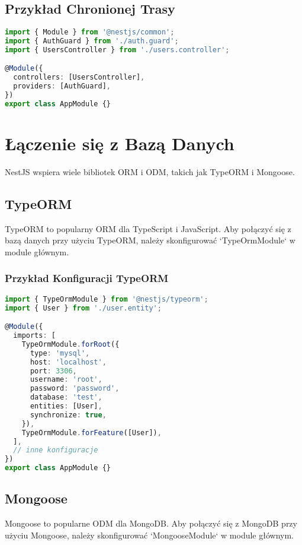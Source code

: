 \documentclass[a4paper,12pt]{article}
\begin{document}
\subsection{Przykład Chronionej Trasy}
\begin{lstlisting}[language=TypeScript, caption=Przykład chronionej trasy w NestJS]
import { Module } from '@nestjs/common';
import { AuthGuard } from './auth.guard';
import { UsersController } from './users.controller';

@Module({
  controllers: [UsersController],
  providers: [AuthGuard],
})
export class AppModule {}
\end{lstlisting}

\section{Łączenie się z Bazą Danych}
NestJS wspiera wiele bibliotek ORM i ODM, takich jak TypeORM i Mongoose.

\subsection{TypeORM}
TypeORM to popularny ORM dla TypeScript i JavaScript. Aby połączyć się z bazą danych przy użyciu TypeORM, należy skonfigurować `TypeOrmModule` w module głównym.

\subsubsection{Przykład Konfiguracji TypeORM}
\begin{lstlisting}[language=TypeScript, caption=Konfiguracja TypeORM w NestJS]
import { TypeOrmModule } from '@nestjs/typeorm';
import { User } from './user.entity';

@Module({
  imports: [
    TypeOrmModule.forRoot({
      type: 'mysql',
      host: 'localhost',
      port: 3306,
      username: 'root',
      password: 'password',
      database: 'test',
      entities: [User],
      synchronize: true,
    }),
    TypeOrmModule.forFeature([User]),
  ],
  // inne konfiguracje
})
export class AppModule {}
\end{lstlisting}

\subsection{Mongoose}
Mongoose to popularne ODM dla MongoDB. Aby połączyć się z MongoDB przy użyciu Mongoose, należy skonfigurować `MongooseModule` w module głównym.
\end{document}

